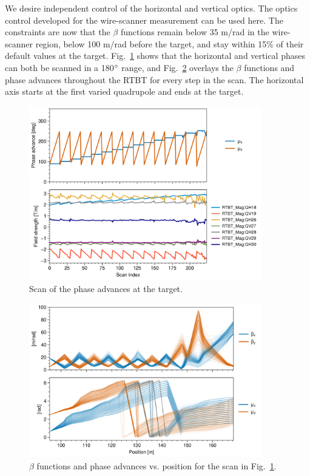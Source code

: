 We desire independent control of the horizontal and vertical optics. The optics control developed for the wire-scanner measurement can be used here. The constraints are now that the $\beta$ functions remain below 35 m/rad in the wire-scanner region, below 100 m/rad before the target, and stay within 15\% of their default values at the target. Fig.~\ref{fig:target_phase_scan_1} shows that the horizontal and vertical phases can both be scanned in a 180$\degree$ range, and Fig.~\ref{fig:target_phase_scan_2} overlays the $\beta$ functions and phase advances throughout the RTBT for every step in the scan. The horizontal axis starts at the first varied quadrupole and ends at the target.
%
\begin{figure}[!p]
    \centering
    \vspace*{2.0cm}
    \includegraphics[width=0.9\textwidth]{Images/chapter4/target_phase_scan1.png}
    \caption{Scan of the phase advances at the target.}
     \label{fig:target_phase_scan_1}
    \vspace*{2.0cm}
\end{figure}
%
\begin{figure}[!p]
    \centering
    \includegraphics[width=0.9\textwidth]{Images/chapter4/target_phase_scan2.png}
    \caption{$\beta$ functions and phase advances vs. position for the scan in Fig.~\ref{fig:target_phase_scan_1}.}
    \label{fig:target_phase_scan_2}
\end{figure}
